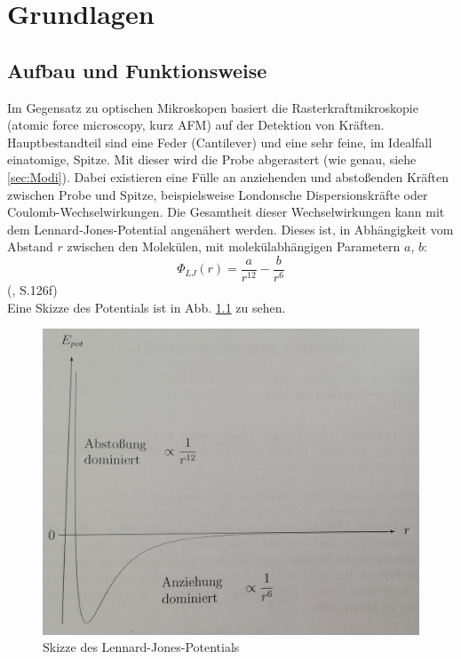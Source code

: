 
\chapter{Grundlagen}
\section{Aufbau und Funktionsweise}
Im Gegensatz zu optischen Mikroskopen basiert die Rasterkraftmikroskopie (atomic force microscopy, kurz AFM) auf der Detektion von Kräften. 
Hauptbestandteil sind eine Feder (Cantilever) und eine sehr feine, im Idealfall einatomige, Spitze. Mit dieser wird die Probe abgerastert 
(wie genau, siehe \ref{sec:Modi}). Dabei existieren eine Fülle an anziehenden und abstoßenden Kräften zwischen Probe und Spitze, beispielsweise 
Londonsche Dispersionskräfte oder Coulomb-Wechselwirkungen. Die Gesamtheit dieser Wechselwirkungen kann mit dem Lennard-Jones-Potential 
angenähert werden. Dieses ist, in Abhängigkeit vom Abstand $r$ zwischen den Molekülen, mit molekülabhängigen Parametern $a$, $b$: 
\begin{equation*}
    \Phi_{LJ}(r) = \frac{a}{r^{12}} - \frac{b}{r^6}
\end{equation*}
(\cite{Demtroeder2013}, S.126f) \\
Eine Skizze des Potentials ist in Abb. \ref{bild:LJP} zu sehen.

\begin{figure}[h]
    \centering
    \includegraphics[scale = 0.135]{Bilder/LennardJones.jpg}
    \caption{Skizze des Lennard-Jones-Potentials \protect \footnotemark}
    \label{bild:LJP}
\end{figure}

